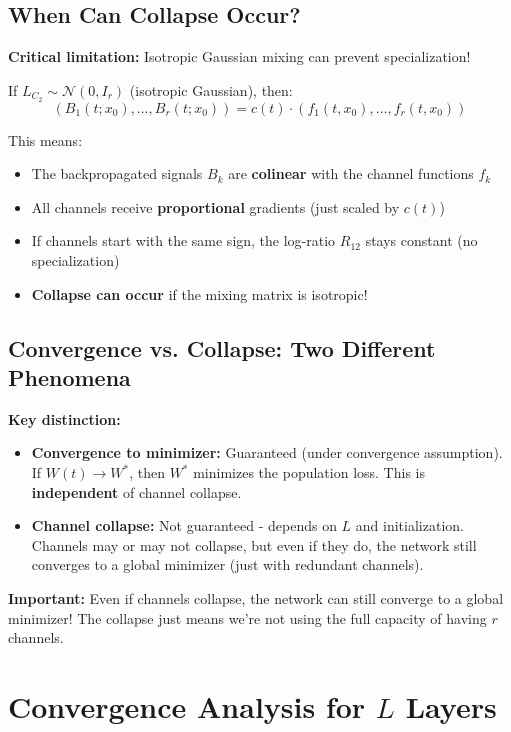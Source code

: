 \documentclass[11pt]{article}
\newcommand{\1}{\mathbbm{1}}
\begin{document}
\subsection{When Can Collapse Occur?}

\textbf{Critical limitation:} Isotropic Gaussian mixing can prevent specialization!

If $L_{C_2} \sim \mathcal{N}(0, I_r)$ (isotropic Gaussian), then:
\[
(B_1(t; x_0), \ldots, B_r(t; x_0)) = c(t) \cdot (f_1(t, x_0), \ldots, f_r(t, x_0))
\]

This means:
\begin{itemize}
\item The backpropagated signals $B_k$ are \textbf{colinear} with the channel functions $f_k$
\item All channels receive \textbf{proportional} gradients (just scaled by $c(t)$)
\item If channels start with the same sign, the log-ratio $R_{12}$ stays constant (no specialization)
\item \textbf{Collapse can occur} if the mixing matrix is isotropic!
\end{itemize}

\subsection{Convergence vs. Collapse: Two Different Phenomena}

\textbf{Key distinction:}

\begin{itemize}
\item \textbf{Convergence to minimizer:} Guaranteed (under convergence assumption). If $W(t) \to W^*$, then $W^*$ minimizes the population loss. This is \textbf{independent} of channel collapse.

\item \textbf{Channel collapse:} Not guaranteed - depends on $L$ and initialization. Channels may or may not collapse, but even if they do, the network still converges to a global minimizer (just with redundant channels).
\end{itemize}

\textbf{Important:} Even if channels collapse, the network can still converge to a global minimizer! The collapse just means we're not using the full capacity of having $r$ channels.

\section{Convergence Analysis for $L$ Layers}
\end{document}
